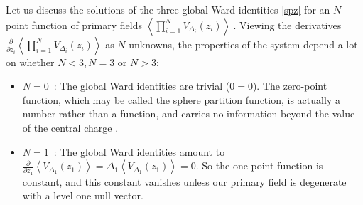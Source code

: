 \documentclass[12pt, a4paper, notitlepage, twoside]{report}
\numberwithin{equation}{section}
\theoremstyle{break}
\begin{document}
Let us discuss the solutions of the three global Ward identities \eqref{spz} for an $N$-point function of primary fields
$
\left\langle \prod_{i=1}^N V_{\Delta_i}(z_i) \right\rangle\ .
$
Viewing the derivatives $\frac{\partial}{\partial z_i}\left\langle \prod_{i=1}^N V_{\Delta_i}(z_i) \right\rangle$ as $N$ unknowns, the properties of the system depend a lot on whether $N<3, N=3$ or $N>3$:
\begin{itemize}
 \item $\boxed{N=0}$\ : The global Ward identities are trivial ($0=0$).
The zero-point function, which may be called the sphere partition function, is actually a number rather than a function, and carries no information beyond the value of the central charge \cite{car01}.

\item $\boxed{N=1}$\ :  The global Ward identities amount to $\frac{\partial}{\partial z_1}\left\langle V_{\Delta_1}(z_1)\right\rangle  =\Delta_1 \left\langle V_{\Delta_1}(z_1)\right\rangle =0$.
So the one-point function is constant, and this constant vanishes unless our primary field is degenerate with a level one null vector.


\end{itemize}
\end{document}
